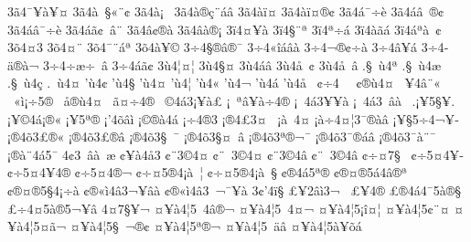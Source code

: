 {3^^e34^^af^^a5^^e0^^a5^^a4
3^^e34^^e0^^a0^^a7^^ab^^a8^^a2
3^^e34^^e0^^a1^^a0^^ad
3^^e34^^e0^^ae^^e7^^a8^^e1^^e2
3^^e34^^e0^^ef^^a4
3^^e34^^e0^^ef^^a4^^ae^^a2
3^^e34^^e1^^af^^f7^^e8
3^^e34^^e1^^e2^^a0^^ad^^ae^^a2
3^^e34^^e1^^e2^^af^^f7^^e8
3^^e34^^e1^^e3^^a2^^a0^^e2^^a8
3^^e34^^e2^^a2^^ae^^e0
3^^e34^^e2^^e0^^ae^^a1^^ad
3^^ef4^^a4^^a5^^e0^^ad
3^^ef4^^a7^^a8^^aa
3^^ef4^^aa^^f7^^e1
3^^ef4^^e0^^e3^^e1
3^^ef4^^e1^^aa^^e0^^a0^^a2
3^^f54^^a43^^ad
3^^f54^^a4^^a8^^ad
3^^f54^^af^^a8^^e1^^aa
3^^f54^^e0^^a5^^a9
3^^f74^^a7^^ae^^e2^^ae^^af
3^^f74^^ab^^ee^^e1^^e2^^e0
3^^f74^^ac^^ae^^a2^^f7^^e0
3^^f74^^ad^^e2^^a5^^ad^^e1
3^^f74^^ad^^e4^^ae^^e0^^ac
3^^f74^^ad^^f7^^e6^^f7^^a0^^e2
3^^f74^^e1^^ad^^e3^^a2
3^^f94^^a6^^a4^^a6
3^^f94^^a7^^a4
3^^f94^^e1^^e2
3^^f94^^e5^^a0^^a2
3^^f94^^e5^^a0^^e2
.^^a7^^a0^^f94^^aa
.^^a7^^a0^^f94^^e6
.^^a7^^a0^^f94^^e7
.^^ad^^a0^^f94^^a4
'^^f94^^a2
'^^f94^^a7
'^^f94^^a4
'^^f94^^a6
'^^f94^^ab
'^^f94^^ac
'^^f94^^e1
'^^f94^^e5
^^a0^^a2^^f74^^a0
^^a0^^a2^^ae^^f94^^a4
^^a0^^a54^^e2^^a8^^ab
^^a0^^ab^^ec^^a1^^f75^^ae^^ad
^^a0^^e5^^ae^^f94^^a4
^^a0^^e3^^a4^^f74^^ae
^^a0^^a94^^e13^^a1^^a5^^e0^^a3
^^a1^^a0^^aa^^e2^^a5^^e0^^f74^^ae
^^a1^^a04^^e13^^a5^^ad^^a5^^e0
^^a1^^a04^^e13^^a0^^ad^^e2^^e0^^a0
.^^a1^^a55^^a7^^a5.
^^a1^^a5^^a94^^e1^^a1^^ae^^ab
^^a1^^a55^^aa^^ae^^ad
^^a1'4^^f5^^e2^^ec
^^a1^^a9^^ae^^e04^^ad^^e1
^^a1^^f74^^ae3
^^a1^^ae4^^a33^^a4^^a0^^ad
^^a1^^e0^^a0^^ad4^^a4
^^a1^^e0^^f74^^a4^^a63^^af^^ae^^e0^^e2
^^a1^^a5^^a75^^f74^^ac^^a5^^ad
^^a1^^ae4^^f53^^a3^^ae^^ab
^^a1^^ae4^^f53^^a3^^ae^^e2
^^a1^^ae4^^f53^^a7^^a0^^af
^^a1^^ae4^^f53^^a7^^a4^^a0^^e2
^^a1^^ae4^^f53^^aa^^ae^^ac^^af
^^a1^^ae4^^f53^^af^^ae^^e1^^e2
^^a1^^ae4^^f53^^af^^e0^^a8^^af
^^a1^^ae^^e0^^a84^^e15^^af
4^^a23^^a0^^ad^^e2^^e0^^a0^^e6
^^a2^^a5^^e04^^e53^^ad
^^a2^^a83^^a94^^a4
^^a2^^a8^^ad^^a03^^a94^^a4
^^a2^^a83^^a94^^e2
^^a2^^a8^^ad^^a03^^a94^^e2
^^a2^^f7^^a47^^a7^^ad^^a0
^^a2^^f75^^a44^^a5^^ad
^^a2^^f75^^a44^^a54^^ae
^^a2^^f75^^a44^^ae^^ac
^^a2^^f7^^a45^^ae4^^a1^^e0^^a0^^a6
^^a2^^f7^^a45^^ae4^^a1^^e0^^a0^^a7
^^a2^^ae4^^e15^^aa^^ae
^^a2^^ae^^a4^^ae5^^e14^^e2^^ae^^aa
^^a2^^ae^^a4^^ae5^^a74^^a1^^f7^^e0
^^a2^^ae^^ab^^ec4^^e23^^ac^^a5^^e2^^e0
^^a2^^ae^^ab^^ec4^^e23^^a0^^ac^^af^^a5^^e0
3^^a2'4^^ef^^a7
^^a3^^a52^^e2^^ec3^^ac^^a0^^ad
^^a3^^a54^^ae
^^a3^^ae4^^e14^^af5^^e0^^ae^^a7
^^a3^^f74^^a45^^e0^^ae5^^ac^^a5^^e2
4^^a47^^a7^^a5^^ac
^^a4^^a5^^e04^^a65^^a04^^e2^^ae^^ac
^^a4^^a5^^e04^^a65^^a04^^a4^^ac
^^a4^^a5^^e04^^a65^^a1^^ee^^a4^^a6
^^a4^^a5^^e04^^a65^^a2^^a8^^a4
^^a4^^a5^^e04^^a65^^a4^^e3^^ac
^^a4^^a5^^e04^^a65^^a7^^a0^^ac^^ae^^a2
^^a4^^a5^^e04^^a65^^aa^^ae^^ac
^^a4^^a5^^e04^^a65^^ad^^a0^^e4^^e2
^^a4^^a5^^e04^^a65^^e0^^a5^^f5^^e1
}
